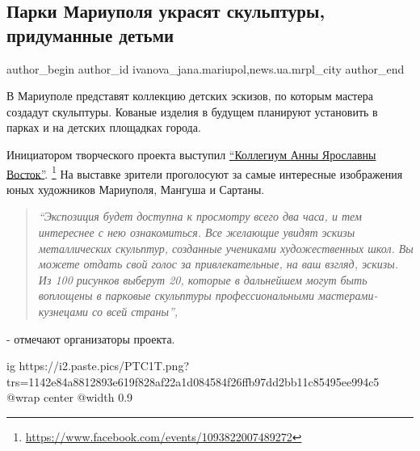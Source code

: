  
 
 
 
 
 
\subsection{Парки Мариуполя украсят скульптуры, придуманные детьми}
\label{sec:12_02_2019.stz.news.ua.mrpl_city.2.parki_mrpl_skulptury_ukrashennie_detmi}
 
\ifcmt
 author_begin
   author_id ivanova_jana.mariupol,news.ua.mrpl_city
 author_end
\fi


В Мариуполе представят коллекцию детских эскизов, по которым мастера создадут
скульптуры. Кованые изделия в будущем планируют установить в парках и на
детских площадках города.

Инициатором творческого проекта выступил
\href{https://www.facebook.com/events/1093822007489272}{\enquote{Коллегиум Анны
Ярославны Восток}}.%
\footnote{\url{https://www.facebook.com/events/1093822007489272}}
На выставке зрители проголосуют за самые интересные
изображения юных художников Мариуполя, Мангуша и Сартаны.

\begin{quote}
\em\enquote{Экспозиция будет доступна к просмотру всего два часа, и тем интереснее с нею
ознакомиться. Все желающие увидят эскизы металлических скульптур, созданные
учениками художественных школ. Вы можете отдать свой голос за привлекательные,
на ваш взгляд, эскизы. Из 100 рисунков выберут 20, которые в дальнейшем могут
быть воплощены в парковые скульптуры профессиональными мастерами-кузнецами со
всей страны}, 
\end{quote}
- отмечают организаторы проекта.

\ifcmt
  ig https://i2.paste.pics/PTC1T.png?trs=1142e84a8812893e619f828af22a1d084584f26ffb97dd2bb11c85495ee994c5
  @wrap center
  @width 0.9
\fi

